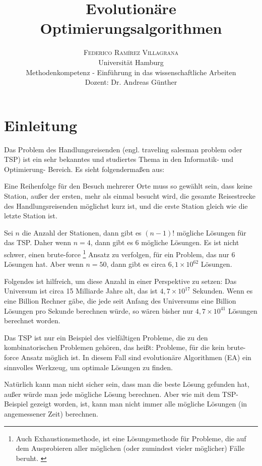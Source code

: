 \documentclass[twoside,twocolumn]{article}
\title{Evolutionäre Optimierungsalgorithmen} %
\author {
	\textsc{Federico Ramírez Villagrana} \\[1ex]
	\normalsize Universität Hamburg \\
	\normalsize Methodenkompetenz - Einführung in das wissenschaftliche Arbeiten \\
	\normalsize Dozent: Dr. Andreas Günther
}
\date{} %
\newcommand{\e}[1]{\times 10^{#1}}
\begin{document}
\maketitle


\section{Einleitung}
Das Problem des Handlungsreisenden (engl. traveling salesman problem oder TSP) ist ein sehr bekanntes und studiertes Thema in den Informatik- und Optimierung- Bereich. Es sieht folgendermaßen aus:\par
Eine Reihenfolge für den Besuch mehrerer Orte muss so gewählt sein, dass keine Station, außer der ersten, mehr als einmal besucht wird, die gesamte Reisestrecke des Handlungsreisenden möglichst kurz ist, und die erste Station gleich wie die letzte Station ist. \cite{wiki_tsp}\par
Sei $n$ die Anzahl der Stationen, dann gibt es $(n-1)!$ mögliche Lösungen für das TSP. Daher wenn $n=4$, dann gibt es $6$ mögliche Lösungen. Es ist nicht schwer, einen brute-force \footnote{Auch Exhaustionsmethode, ist eine Lösungsmethode für Probleme, die auf dem Ausprobieren aller möglichen (oder zumindest vieler möglicher) Fälle beruht. \cite{wiki_brute_force}} Ansatz zu verfolgen, für ein Problem, das nur 6 Lösungen hat. Aber wenn $n=50$, dann gibt es circa $6,1\e{62}$ Lösungen.\par
Folgendes ist hilfreich, um diese Anzahl in einer Perspektive zu setzen: Das Universum ist circa 15 Milliarde Jahre alt, das ist $4,7\e{17}$ Sekunden. Wenn es eine Billion Rechner gäbe, die jede seit Anfang des Universums eine Billion Lösungen pro Sekunde berechnen würde, so wären bisher nur $4,7\e{41}$ Lösungen berechnet worden.\par
Das TSP ist nur ein Beispiel des vielfältigen Probleme, die zu den kombinatorischen Problemen gehören, das heißt: Probleme, für die kein brute-force Ansatz möglich ist. In diesem Fall sind evolutionäre Algorithmen (EA) ein sinnvolles Werkzeug, um optimale Lösungen zu finden.\par
Natürlich kann man nicht sicher sein, dass man die beste Lösung gefunden hat, außer würde man jede mögliche Lösung berechnen. Aber wie mit dem TSP-Beispiel gezeigt worden, ist, kann man nicht immer alle mögliche Lösungen (in angemessener Zeit) berechnen.
\end{document}
